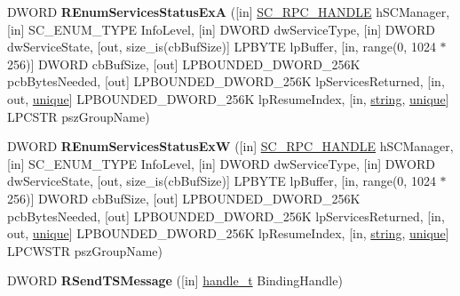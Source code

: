 \begin{DoxyCompactItemize}
\item 
\mbox{\label{interfacesvcctl_aacad9f364ee25495710474acd134ed1b}} 
D\+W\+O\+RD {\bfseries R\+Enum\+Services\+Status\+ExA} (\mbox{[}in\mbox{]} \hyperlink{interfacevoid}{S\+C\+\_\+\+R\+P\+C\+\_\+\+H\+A\+N\+D\+LE} h\+S\+C\+Manager, \mbox{[}in\mbox{]} S\+C\+\_\+\+E\+N\+U\+M\+\_\+\+T\+Y\+PE Info\+Level, \mbox{[}in\mbox{]} D\+W\+O\+RD dw\+Service\+Type, \mbox{[}in\mbox{]} D\+W\+O\+RD dw\+Service\+State, \mbox{[}out, size\+\_\+is(cb\+Buf\+Size)\mbox{]} L\+P\+B\+Y\+TE lp\+Buffer, \mbox{[}in, range(0, 1024 $\ast$256)\mbox{]} D\+W\+O\+RD cb\+Buf\+Size, \mbox{[}out\mbox{]} L\+P\+B\+O\+U\+N\+D\+E\+D\+\_\+\+D\+W\+O\+R\+D\+\_\+256K pcb\+Bytes\+Needed, \mbox{[}out\mbox{]} L\+P\+B\+O\+U\+N\+D\+E\+D\+\_\+\+D\+W\+O\+R\+D\+\_\+256K lp\+Services\+Returned, \mbox{[}in, out, \hyperlink{interfaceunique}{unique}\mbox{]} L\+P\+B\+O\+U\+N\+D\+E\+D\+\_\+\+D\+W\+O\+R\+D\+\_\+256K lp\+Resume\+Index, \mbox{[}in, \hyperlink{structstring}{string}, \hyperlink{interfaceunique}{unique}\mbox{]} L\+P\+C\+S\+TR psz\+Group\+Name)
\item 
\mbox{\label{interfacesvcctl_a6adcf9f6dadad3c5e6500ecb3de9ba74}} 
D\+W\+O\+RD {\bfseries R\+Enum\+Services\+Status\+ExW} (\mbox{[}in\mbox{]} \hyperlink{interfacevoid}{S\+C\+\_\+\+R\+P\+C\+\_\+\+H\+A\+N\+D\+LE} h\+S\+C\+Manager, \mbox{[}in\mbox{]} S\+C\+\_\+\+E\+N\+U\+M\+\_\+\+T\+Y\+PE Info\+Level, \mbox{[}in\mbox{]} D\+W\+O\+RD dw\+Service\+Type, \mbox{[}in\mbox{]} D\+W\+O\+RD dw\+Service\+State, \mbox{[}out, size\+\_\+is(cb\+Buf\+Size)\mbox{]} L\+P\+B\+Y\+TE lp\+Buffer, \mbox{[}in, range(0, 1024 $\ast$256)\mbox{]} D\+W\+O\+RD cb\+Buf\+Size, \mbox{[}out\mbox{]} L\+P\+B\+O\+U\+N\+D\+E\+D\+\_\+\+D\+W\+O\+R\+D\+\_\+256K pcb\+Bytes\+Needed, \mbox{[}out\mbox{]} L\+P\+B\+O\+U\+N\+D\+E\+D\+\_\+\+D\+W\+O\+R\+D\+\_\+256K lp\+Services\+Returned, \mbox{[}in, out, \hyperlink{interfaceunique}{unique}\mbox{]} L\+P\+B\+O\+U\+N\+D\+E\+D\+\_\+\+D\+W\+O\+R\+D\+\_\+256K lp\+Resume\+Index, \mbox{[}in, \hyperlink{structstring}{string}, \hyperlink{interfaceunique}{unique}\mbox{]} L\+P\+C\+W\+S\+TR psz\+Group\+Name)
\item 
\mbox{\label{interfacesvcctl_a6579432fa71b33aa6fc06efd6c7a07b0}} 
D\+W\+O\+RD {\bfseries R\+Send\+T\+S\+Message} (\mbox{[}in\mbox{]} \hyperlink{interfacevoid}{handle\+\_\+t} Binding\+Handle)
\item 
\mbox{\label{interfacesvcctl_ac72105e7cd7b33cb984061559c07b846}} 

\end{DoxyCompactItemize}
